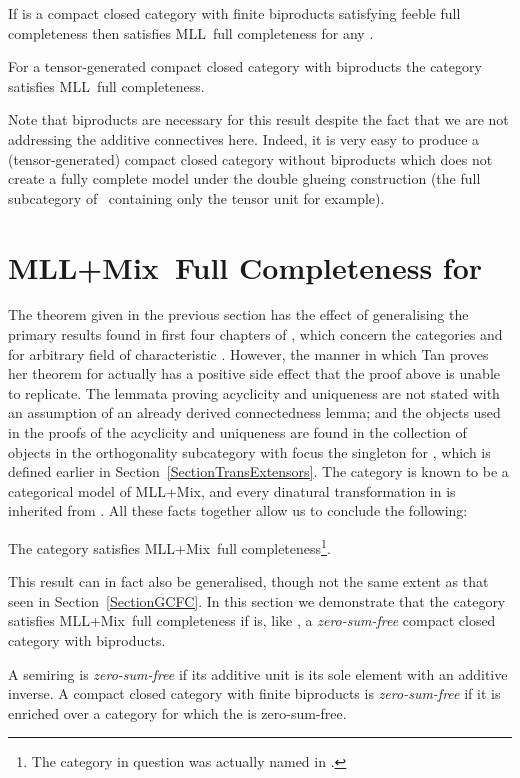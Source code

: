 \documentclass{LMCS}
\theoremstyle{plain}\newtheorem*{cLm}{Claim}
\newcommand{\mll}{MLL} \newcommand{\mall}{MALL}
\newcommand{\mllmix}{MLL+Mix} \newcommand{\GRel}{\mathbf{GRel}}
\newcommand{\hugh}[1]{#1}
\begin{document}
    \begin{thm}
      If\/  is a compact closed category with finite biproducts
      satisfying feeble full completeness then\/  satisfies
      \mll~full completeness for any .
    \end{thm}
    
    \begin{cor}
      For a tensor-generated compact closed category with
      biproducts\/  the category\/  satisfies\/ \mll\ full completeness.
    \end{cor}
    
    Note that biproducts are necessary for this result despite the
      fact that we are not addressing the additive connectives here.
      Indeed, it is very easy to produce a (tensor-generated) compact
      closed category without biproducts which does not create a fully
      complete model under the double glueing construction (the full
      subcategory of~ containing only the tensor unit  for
      example).
    
    \section{\mllmix~Full Completeness for } \label{SectionMLLMixFC}
    
    The theorem given in the previous section has the effect of generalising the primary results found in first four chapters of \cite{Tan97}, which concern the categories  and  for arbitrary field  of characteristic . However, the manner in which Tan proves her theorem for  actually has a positive side effect that the proof above is unable to replicate. The lemmata proving acyclicity and uniqueness are not stated with an assumption of an already derived connectedness lemma; and the objects used in the proofs of the acyclicity and uniqueness are found in the collection of objects in the orthogonality subcategory  with focus the singleton  for , which is defined earlier in Section~\ref{SectionTransExtensors}. The category  is known to be a categorical model of \mllmix, and every dinatural transformation in  is inherited from . All these facts together allow us to conclude the following:
    
    \begin{fact}\hugh{\cite{Tan97}}
    The category  satisfies \mllmix~full completeness\footnote{The category in question was actually named  in \cite{Tan97}.}.
    \end{fact}
    
    This result can in fact also be generalised, though not the same extent as that seen in Section~\ref{SectionGCFC}. In this section we demonstrate that the category  satisfies \mllmix~full completeness if  is, like , a \emph{zero-sum-free} compact closed category with biproducts.
    \hugh{\begin{defi}
    A semiring  is \emph{zero-sum-free} if its additive unit  is its sole element with an additive inverse. A compact closed category with finite biproducts is \emph{zero-sum-free} if it is enriched over a category  for which the  is zero-sum-free.
    \end{defi}}
    
\end{document}
